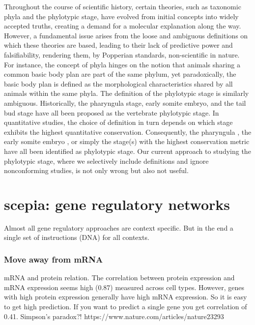 Throughout the course of scientific history, certain theories, such as taxonomic phyla and the phylotypic stage, have evolved from initial concepts into widely accepted truths, creating a demand for a molecular explanation along the way. However, a fundamental issue arises from the loose and ambiguous definitions on which these theories are based, leading to their lack of predictive power and falsifiability, rendering them, by Popperian standards, non-scientific in nature. For instance, the concept of phyla hinges on the notion that animals sharing a common basic body plan are part of the same phylum, yet paradoxically, the basic body plan is defined as the morphological characteristics shared by all animals within the same phyla\cite{BUDD2000}. The definition of the phylotypic stage is similarly ambiguous. Historically, the pharyngula stage\cite{https://doi.org/10.1093/icb/21.2.391}, early somite embryo\cite{ https://doi.org/10.1046/j.1420-9101.1993.6030457.x}, and the tail bud stage \cite{Slack1993} have all been proposed as the vertebrate phylotypic stage. In quantitative studies, the choice of definition in turn depends on which stage exhibits the highest quantitative conservation. Consequently, the pharyngula \cite{Irie2011,marletaz2018}, the early somite embryo \cite{DomazetLoso2010}, or simply the stage(s) with the highest conservation metric\cite{Kalinka2010,Cordero2020} have all been identified as phylotypic stage. Our current approach to studying the phylotypic stage, where we selectively include definitions and ignore nonconforming studies, is not only wrong but also not useful.

\section{scepia: gene regulatory networks}

Almost all gene regulatory approaches are context specific. But in the end a single set of instructions (DNA) for all contexts.

\subsubsection{Move away from mRNA}

mRNA and protein relation.
The correlation between protein expression and mRNA expression seems high (0.87) measured across cell types. However, genes with high protein expression generally have high mRNA expression. So it is easy to get high prediction. If you want to predict a single gene you get correlation of 0.41. Simpson's paradox?!
https://www.nature.com/articles/nature23293

